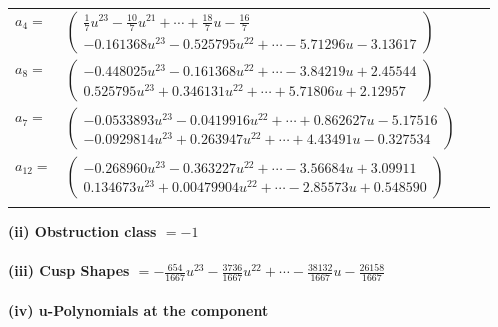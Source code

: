 \documentclass[1p]{elsarticle_modified}
\theoremstyle{definition}
\begin{document}
\begin{tabular}{m{7pt} m{180pt} m{7pt} m{180pt} }
\flushright $a_{4}=$&$\begin{pmatrix}\frac{1}{7} u^{23}-\frac{10}{7} u^{21}+\cdots+\frac{18}{7} u-\frac{16}{7}\\-0.161368 u^{23}-0.525795 u^{22}+\cdots-5.71296 u-3.13617\end{pmatrix}$ \\
\flushright $a_{8}=$&$\begin{pmatrix}-0.448025 u^{23}-0.161368 u^{22}+\cdots-3.84219 u+2.45544\\0.525795 u^{23}+0.346131 u^{22}+\cdots+5.71806 u+2.12957\end{pmatrix}$ \\
\flushright $a_{7}=$&$\begin{pmatrix}-0.0533893 u^{23}-0.0419916 u^{22}+\cdots+0.862627 u-5.17516\\-0.0929814 u^{23}+0.263947 u^{22}+\cdots+4.43491 u-0.327534\end{pmatrix}$ \\
\flushright $a_{12}=$&$\begin{pmatrix}-0.268960 u^{23}-0.363227 u^{22}+\cdots-3.56684 u+3.09911\\0.134673 u^{23}+0.00479904 u^{22}+\cdots-2.85573 u+0.548590\end{pmatrix}$\\&\end{tabular}
\flushleft \textbf{(ii) Obstruction class $= -1$}\\~\\
\flushleft \textbf{(iii) Cusp Shapes $= -\frac{654}{1667} u^{23}-\frac{3736}{1667} u^{22}+\cdots-\frac{38132}{1667} u-\frac{26158}{1667}$}\\~\\
\newpage\renewcommand{\arraystretch}{1}
\flushleft \textbf{(iv) u-Polynomials at the component}\newline \\
\end{document}
